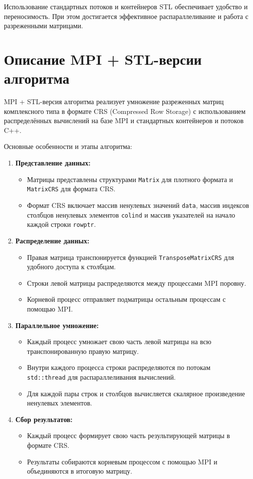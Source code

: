 \documentclass[a4paper,12pt]{article}
\begin{document}
Использование стандартных потоков и контейнеров STL обеспечивает удобство и переносимость. При этом достигается эффективное распараллеливание и работа с разреженными матрицами.

\newpage

\section{Описание MPI + STL-версии алгоритма}

MPI + STL-версия алгоритма реализует умножение разреженных матриц комплексного типа в формате CRS (Compressed Row Storage) с использованием распределённых вычислений на базе MPI и стандартных контейнеров и потоков C++.

Основные особенности и этапы алгоритма:

\begin{enumerate}
  \item \textbf{Представление данных:}
  \begin{itemize}
    \item Матрицы представлены структурами \texttt{Matrix} для плотного формата и \texttt{MatrixCRS} для формата CRS.
    \item Формат CRS включает массив ненулевых значений \texttt{data}, массив индексов столбцов ненулевых элементов \texttt{colind} и массив указателей на начало каждой строки \texttt{rowptr}.
  \end{itemize}

  \item \textbf{Распределение данных:}
  \begin{itemize}
    \item Правая матрица транспонируется функцией \texttt{TransposeMatrixCRS} для удобного доступа к столбцам.
    \item Строки левой матрицы распределяются между процессами MPI поровну.
    \item Корневой процесс отправляет подматрицы остальным процессам с помощью MPI.
  \end{itemize}

  \item \textbf{Параллельное умножение:}
  \begin{itemize}
    \item Каждый процесс умножает свою часть левой матрицы на всю транспонированную правую матрицу.
    \item Внутри каждого процесса строки распределяются по потокам \texttt{std::thread} для распараллеливания вычислений.
    \item Для каждой пары строк и столбцов вычисляется скалярное произведение ненулевых элементов.
  \end{itemize}

  \item \textbf{Сбор результатов:}
  \begin{itemize}
    \item Каждый процесс формирует свою часть результирующей матрицы в формате CRS.
    \item Результаты собираются корневым процессом с помощью MPI и объединяются в итоговую матрицу.
  \end{itemize}
\end{enumerate}
\end{document}

